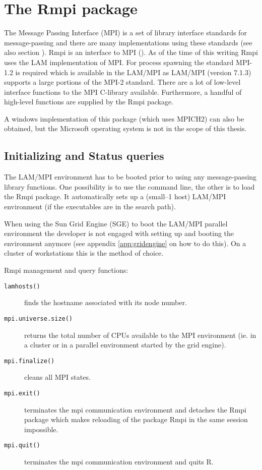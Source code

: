 \section{The Rmpi package}
\label{sec:Rmpi}
The Message Passing Interface (MPI) is a set of library interface
standards for message-passing and there are many implementations using
these standards (see also section \cite{sec:MPI}).
Rmpi is an interface to MPI (\cite{yu06Rmpi}). As of the time of this
writing Rmpi uses
the LAM implementation of MPI. For process spawning the standard
MPI-1.2 is required which is available in the LAM/MPI 
as LAM/MPI (version 7.1.3) supports a large portions of the MPI-2
standard. There are 
a lot of low-level interface functions to the MPI C-library available.
Furthermore, a handful of high-level functions are supplied by the
Rmpi package. 

A windows implementation of this package (which uses MPICH2)
can also be obtained, but the Microsoft operating system is not in the
scope of this thesis.

\subsection{Initializing and Status queries}

The LAM/MPI environment has to be booted prior to using any
message-passing library functions. One possibility is to use the
command line, the other is to load the Rmpi package. It automatically
sets up a (small--1 host) LAM/MPI environment (if the executables are
in the search path). 

When using the Sun Grid Engine (SGE) to boot the LAM/MPI parallel
environment the developer is not engaged with
setting up and booting the environment anymore (see
appendix \ref{app:gridengine} on how to do this). On a cluster of
workstations this is the method of choice. 


Rmpi management and query functions:

\begin{description}
\item[\texttt{lamhosts()}] finds the hostname associated with its node
  number.
\item[\texttt{mpi.universe.size()}] returns the total number of CPUs
  available to the MPI environment (ie. in a cluster or in a parallel
  environment started by the grid engine).
\item[\texttt{mpi.finalize()}] cleans all MPI states.
\item[\texttt{mpi.exit()}] terminates the mpi communication
  environment and detaches the Rmpi package which makes reloading of
  the package Rmpi in the same session impossible.  
\item[\texttt{mpi.quit()}] terminates the mpi communication
  environment and quits R.  
\end{description}
  

